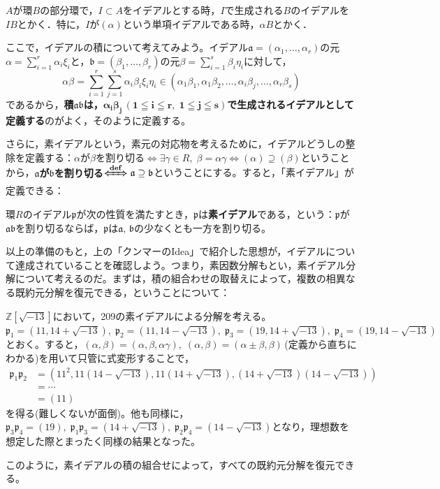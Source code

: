 \begin{dfn}[イデアルが生成するイデアル]
    $A$が環$B$の部分環で，$I\subset A$をイデアルとする時，$I$で生成される$B$のイデアルを$IB$とかく．特に，$I$が$(\alpha)$という単項イデアルである時，$\alpha B$とかく．
\end{dfn}

ここで，イデアルの積について考えてみよう。イデアル$\mathfrak{a}=(\alpha_1,\ldots,\alpha_r)$の元$\alpha=\sum_{i=1}^{r}\alpha_i\xi_i$と，$\mathfrak{b}=(\beta_1,\ldots,\beta_r)$の元$\beta=\sum_{i=1}^{s}\beta_i\eta_i$に対して，\[
\alpha\beta=\sum_{i=1}^{r}\sum_{j=1}^{s}\alpha_i\beta_i\xi_i\eta_i\in(\alpha_1\beta_1,\alpha_1\beta_2,\ldots,\alpha_i\beta_j,\ldots,\alpha_r\beta_s)
\]であるから，\textbf{積$\mathfrak{a}\mathfrak{b}$は，$\boldsymbol{\alpha_i\beta_j\,(1\leqq i\leqq r,\; 1\leqq j\leqq s)}$で生成されるイデアルとして定義する}のがよく，そのように定義する。

さらに，素イデアルという，素元の対応物を考えるために，イデアルどうしの整除を定義する：$\alpha$が$\beta$を割り切る$\iff \exists\gamma\in R,\; \beta=\alpha\gamma \iff (\alpha)\supseteq (\beta)$ということから，\textbf{$\mathfrak{a}$が$\mathfrak{b}$を割り切る$\boldsymbol{\xLeftrightarrow{\mathrm{def}}}\mathfrak{a}\supseteq\mathfrak{b}$}ということにする。すると，「素イデアル」が定義できる：

\begin{dfn}[素イデアル]
    環$R$のイデアル$\mathfrak{p}$が次の性質を満たすとき，$\mathfrak{p}$は\textbf{素イデアル}である，という：$\mathfrak{p}$が$\mathfrak{ab}$を割り切るならば，$\mathfrak{p}$は$\mathfrak{a},\, \mathfrak{b}$の少なくとも一方を割り切る。
\end{dfn}

以上の準備のもと，上の「クンマーのIdea」で紹介した思想が，イデアルについて達成されていることを確認しよう。つまり，素因数分解もとい，素イデアル分解について考えるのだ。まずは，積の組合わせの取替えによって，複数の相異なる既約元分解を復元できる，ということについて：

\begin{mybox}[既約元分解の復元]
    $\mathds{Z}[\sqrt{-13}]$において，209の素イデアルによる分解を考える。$\mathfrak{p}_1=(11,14+\sqrt{-13}),\; \mathfrak{p}_2=(11,14-\sqrt{-13}),\; \mathfrak{p}_3=(19,14+\sqrt{-13}),\; \mathfrak{p}_4=(19,14-\sqrt{-13})$とおく。すると，$(\alpha,\beta)=(\alpha,\beta,\alpha\gamma),\; (\alpha,\beta)=(\alpha\pm\beta,\beta)$\,(定義から直ちにわかる)を用いて只管に式変形することで，
    \begin{align*}
        \mathfrak{p}_1\mathfrak{p}_2
        &= \left(11^2,11\left(14-\sqrt{-13}\right),11\left(14+\sqrt{-13}\right),\left(14+\sqrt{-13}\right)\left(14-\sqrt{-13}\right)\right)\\
        &= \cdots\\
        &= \left(11\right)
    \end{align*}
    を得る(難しくないが面倒)。他も同様に，$\mathfrak{p}_3\mathfrak{p}_4=(19),\; \mathfrak{p}_1\mathfrak{p}_3=(14+\sqrt{-13}),\; \mathfrak{p}_2\mathfrak{p}_4=(14-\sqrt{-13})$となり，理想数を想定した際とまったく同様の結果となった。

    このように，素イデアルの積の組合せによって，すべての既約元分解を復元できる。
\end{mybox}

